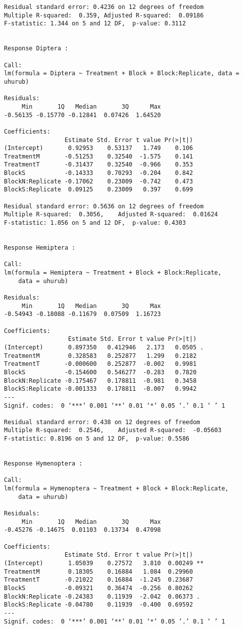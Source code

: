 \documentclass[11pt]{article}
\begin{document}
\begin{verbatim}
Residual standard error: 0.4236 on 12 degrees of freedom
Multiple R-squared:  0.359,	Adjusted R-squared:  0.09186 
F-statistic: 1.344 on 5 and 12 DF,  p-value: 0.3112


Response Diptera :

Call:
lm(formula = Diptera ~ Treatment + Block + Block:Replicate, data = uhurub)

Residuals:
     Min       1Q   Median       3Q      Max 
-0.56135 -0.15770 -0.12841  0.07426  1.64520 

Coefficients:
                 Estimate Std. Error t value Pr(>|t|)
(Intercept)       0.92953    0.53137   1.749    0.106
TreatmentM       -0.51253    0.32540  -1.575    0.141
TreatmentT       -0.31437    0.32540  -0.966    0.353
BlockS           -0.14333    0.70293  -0.204    0.842
BlockN:Replicate -0.17062    0.23009  -0.742    0.473
BlockS:Replicate  0.09125    0.23009   0.397    0.699

Residual standard error: 0.5636 on 12 degrees of freedom
Multiple R-squared:  0.3056,	Adjusted R-squared:  0.01624 
F-statistic: 1.056 on 5 and 12 DF,  p-value: 0.4303


Response Hemiptera :

Call:
lm(formula = Hemiptera ~ Treatment + Block + Block:Replicate, 
    data = uhurub)

Residuals:
     Min       1Q   Median       3Q      Max 
-0.54943 -0.18088 -0.11679  0.07509  1.16723 

Coefficients:
                  Estimate Std. Error t value Pr(>|t|)  
(Intercept)       0.897350   0.412946   2.173   0.0505 .
TreatmentM        0.328583   0.252877   1.299   0.2182  
TreatmentT       -0.000600   0.252877  -0.002   0.9981  
BlockS           -0.154600   0.546277  -0.283   0.7820  
BlockN:Replicate -0.175467   0.178811  -0.981   0.3458  
BlockS:Replicate -0.001333   0.178811  -0.007   0.9942  
---
Signif. codes:  0 ‘***’ 0.001 ‘**’ 0.01 ‘*’ 0.05 ‘.’ 0.1 ‘ ’ 1

Residual standard error: 0.438 on 12 degrees of freedom
Multiple R-squared:  0.2546,	Adjusted R-squared:  -0.05603 
F-statistic: 0.8196 on 5 and 12 DF,  p-value: 0.5586


Response Hymenoptera :

Call:
lm(formula = Hymenoptera ~ Treatment + Block + Block:Replicate, 
    data = uhurub)

Residuals:
     Min       1Q   Median       3Q      Max 
-0.45276 -0.14675  0.01103  0.13734  0.47098 

Coefficients:
                 Estimate Std. Error t value Pr(>|t|)   
(Intercept)       1.05039    0.27572   3.810  0.00249 **
TreatmentM        0.18305    0.16884   1.084  0.29960   
TreatmentT       -0.21022    0.16884  -1.245  0.23687   
BlockS           -0.09321    0.36474  -0.256  0.80262   
BlockN:Replicate -0.24383    0.11939  -2.042  0.06373 . 
BlockS:Replicate -0.04780    0.11939  -0.400  0.69592   
---
Signif. codes:  0 ‘***’ 0.001 ‘**’ 0.01 ‘*’ 0.05 ‘.’ 0.1 ‘ ’ 1


\end{verbatim}
\end{document}
